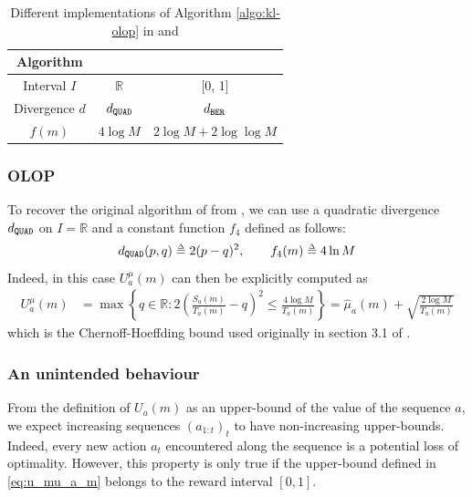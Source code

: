 \begin{table}[tp]
	\caption{Different implementations of Algorithm \ref{algo:kl-olop} in \OLOP and \KLOLOP}
	\label{tab:comparison}
	\centering
	\begin{tabular}{ccc}
		\toprule
		Algorithm & \OLOP & \KLOLOP \\
		\midrule
		Interval $I$ & $\mathbb{R}$ & [0, 1] \\
		Divergence $d$ & $d_\texttt{QUAD}$ & $d_\texttt{BER}$ \\
		$f(m)$ & $4 \log M$ & $2\log M + 2 \log\log M$\\
		\bottomrule
	\end{tabular}
\end{table}

\subsubsection{OLOP}
\label{sec:kl-olop-olop}
To recover the original \OLOP algorithm of \citet{Bubeck2010} from , we can use a quadratic divergence $d_\texttt{QUAD}$ on $I=\mathbb{R}$ and a constant function $f_4$ defined as follows:
\begin{equation*}
\dquad(p,q) \eqdef 2(p-q)^2,\qquad
f_4(m) \eqdef 4 \log M
\end{equation*}
Indeed, in this case $U^{\mu}_a(m)$ can then be explicitly computed as
\begin{align*}
U^{\mu}_a(m) &= \max \left\{q\in \mathbb{R}: 2(\frac{S_a(m)}{T_a(m)} - q)^2 \leq \frac{4 \log M }{T_a(m)} \right\} = \hat{\mu}_a(m) + \sqrt{\frac{2 \log M}{T_a(m)}}
\end{align*}
which is the Chernoff-Hoeffding bound used originally in section 3.1 of \citep{Bubeck2010}.

\subsubsection{An unintended behaviour}
\label{sec:kl-olop-behaviour}
From the definition of $U_a(m)$ as an upper-bound of the value of the sequence $a$, we expect increasing sequences $(a_{1:t})_t$ to have non-increasing upper-bounds. Indeed, every new action $a_t$ encountered along the sequence is a potential loss of optimality.
However, this property is only true if the upper-bound defined in \eqref{eq:u_mu_a_m} belongs to the reward interval $[0,1]$.

